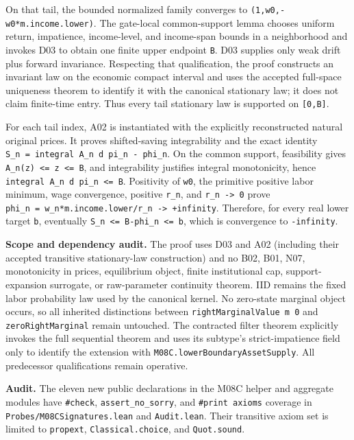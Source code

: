 \documentclass[
  11pt,
]{article}
\let\LedgerOriginalTexttt\texttt
\renewcommand{\texttt}[1]{{\small\LedgerOriginalTexttt{#1}}}
\begin{document}
On that tail, the bounded normalized family converges to
\texttt{(1,w0,-w0*m.income.lower)}. The gate-local common-support lemma
chooses uniform return, impatience, income-level, and income-span bounds
in a neighborhood and invokes D03 to obtain one finite upper endpoint
\texttt{B}. D03 supplies only weak drift plus forward invariance.
Respecting that qualification, the proof constructs an invariant law on
the economic compact interval and uses the accepted full-space
uniqueness theorem to identify it with the canonical stationary law; it
does not claim finite-time entry. Thus every tail stationary law is
supported on \texttt{{[}0,B{]}}.

For each tail index, A02 is instantiated with the explicitly
reconstructed natural original prices. It proves shifted-saving
integrability and the exact identity
\texttt{S\_n\ =\ integral\ A\_n\ d\ pi\_n\ -\ phi\_n}. On the common
support, feasibility gives
\texttt{A\_n(z)\ \textless{}=\ z\ \textless{}=\ B}, and integrability
justifies integral monotonicity, hence
\texttt{integral\ A\_n\ d\ pi\_n\ \textless{}=\ B}. Positivity of
\texttt{w0}, the primitive positive labor minimum, wage convergence,
positive \texttt{r\_n}, and \texttt{r\_n\ -\textgreater{}\ 0} prove
\texttt{phi\_n\ =\ w\_n*m.income.lower/r\_n\ -\textgreater{}\ +infinity}.
Therefore, for every real lower target \texttt{b}, eventually
\texttt{S\_n\ \textless{}=\ B-phi\_n\ \textless{}=\ b}, which is
convergence to \texttt{-infinity}.

\textbf{Scope and dependency audit.} The proof uses D03 and A02
(including their accepted transitive stationary-law construction) and no
B02, B01, N07, monotonicity in prices, equilibrium object, finite
institutional cap, support-expansion surrogate, or raw-parameter
continuity theorem. IID remains the fixed labor probability law used by
the canonical kernel. No zero-state marginal object occurs, so all
inherited distinctions between \texttt{rightMarginalValue\ m\ 0} and
\texttt{zeroRightMarginal} remain untouched. The contracted filter
theorem explicitly invokes the full sequential theorem and uses its
subtype's strict-impatience field only to identify the extension with
\texttt{M08C.lowerBoundaryAssetSupply}. All predecessor qualifications
remain operative.

\textbf{Audit.} The eleven new public declarations in the M08C helper
and aggregate modules have \texttt{\#check}, \texttt{assert\_no\_sorry},
and \texttt{\#print\ axioms} coverage in
\texttt{Probes/M08CSignatures.lean} and \texttt{Audit.lean}. Their
transitive axiom set is limited to \texttt{propext},
\texttt{Classical.choice}, and \texttt{Quot.sound}.
\end{document}
